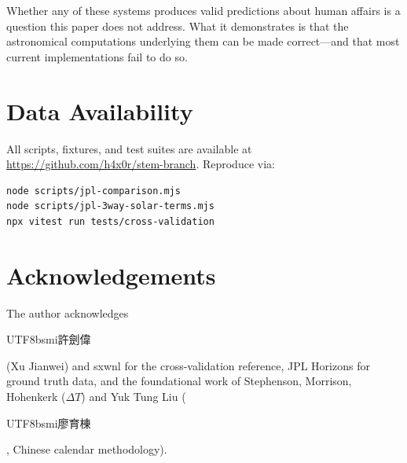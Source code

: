 \documentclass[10pt,a4paper]{article}
\newcommand{\zh}[1]{\begin{CJK}{UTF8}{bsmi}#1\end{CJK}}
\begin{document}
Whether any of these systems produces valid predictions about human
affairs is a question this paper does not address.  What it
demonstrates is that the astronomical computations underlying them
can be made correct---and that most current implementations fail to
do so.

\section*{Data Availability}

All scripts, fixtures, and test suites are available at
\url{https://github.com/h4x0r/stem-branch}. Reproduce via:

{\small
\begin{verbatim}
node scripts/jpl-comparison.mjs
node scripts/jpl-3way-solar-terms.mjs
npx vitest run tests/cross-validation
\end{verbatim}
}

\section*{Acknowledgements}

The author acknowledges \zh{許劍偉} (Xu Jianwei) and sxwnl for the
cross-validation reference, JPL Horizons for ground truth data, and the
foundational work of Stephenson, Morrison, Hohenkerk ($\Delta T$) and
Yuk Tung Liu (\zh{廖育棟}, Chinese calendar methodology).

\end{document}

